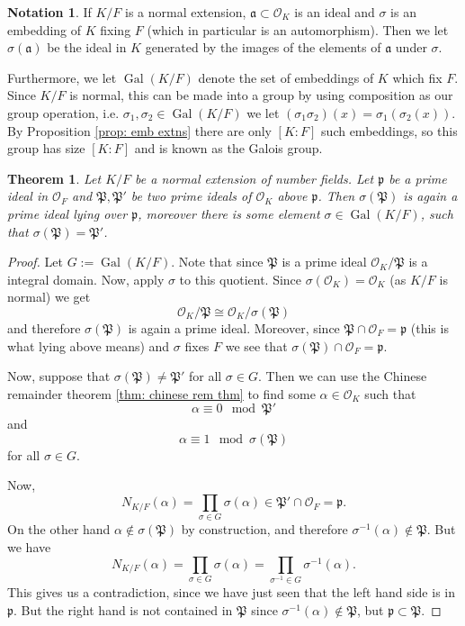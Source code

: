 \documentclass[11pt,a4paper]{report}
\theoremstyle{plain}
\newtheorem{thm}[subsection]{Theorem}
\theoremstyle{definition}
\theoremstyle{definition}
\newtheorem{nota}[subsection]{Notation}
\def \gothP{\mathfrak{P}}
\def\gothp{\mathfrak{p}}
\def \a{\alpha}
\def \s {\sigma}
\def \OO {\mathcal{O}}
\def \s {\sigma}
\def\gotha{\mathfrak{a}}
\DeclareMathOperator{\Gal}{Gal}
\begin{document}
	\begin{nota}
		If $K/F$ is a normal extension, $\gotha \subset \OO_K$ is an ideal and $\s$ is an embedding of $K$ fixing $F$ (which in particular is an automorphism). Then we let $\s(\gotha)$ be the ideal in $K$ generated by the images of the elements of $\gotha$ under $\s$. 
		
		Furthermore, we let $\Gal(K/F)$ denote the set of embeddings of $K$ which fix $F$. Since $K/F$ is normal, this can be made into a group by using composition as our group operation, i.e. $\s_1,\s_2 \in \Gal(K/F)$ we let $(\s_1 \s_2)(x)= \s_1(\s_2(x))$. By  Proposition \ref{prop: emb extns} there are only $[K:F]$ such embeddings, so this group has size $[K:F]$ and is known as the Galois group.
	\end{nota}
	
	
	
	
	
	\begin{thm}\label{thm: ideals and embs}
		Let $K/F$ be a normal extension of number fields. Let $\gothp$ be a prime ideal in $\OO_F$ and $\gothP,\gothP'$ be two prime ideals of $\OO_K$ above $\gothp$. Then $\s(\gothP)$ is again a prime ideal lying over $\gothp$, moreover there is some element $\s \in \Gal(K/F)$, such that $\s(\gothP)=\gothP'$.
	\end{thm}
	
	\begin{proof}
		Let $G:=\Gal(K/F)$. Note that since $\gothP$ is a prime ideal $\OO_K/\gothP$ is a integral domain. Now, apply $\s$ to this quotient. Since $\s(\OO_K)=\OO_K$ (as $K/F$ is normal) we get \[\OO_K/\gothP \cong \OO_K /\s(\gothP)\] and therefore $\s(\gothP)$ is again a prime ideal. Moreover, since $\gothP \cap \OO_F=\gothp$ (this is what lying above means) and $\s$ fixes $F$ we see that $\s(\gothP) \cap \OO_F=\gothp$. 
		
		
		Now, suppose that $\s(\gothP) \neq \gothP'$ for all $\s \in G$. Then we can use the Chinese remainder theorem \ref{thm: chinese rem thm} to find some $\a \in \OO_K$ such that \[\a \equiv 0 \mod \gothP'\] and \[\a \equiv 1 \mod \s(\gothP)\] for all $\s \in G$.
		
		Now, \[N_{K/F}(\a)=\prod_{\s \in G} \s(\a) \in \gothP' \cap \OO_F=\gothp.\] On the other hand $\a \not \in \s(\gothP)$ by construction, and therefore $\s^{-1}(\a) \not \in \gothP$. But we have \[N_{K/F}(\a)=\prod_{\s \in G} \s(\a)=\prod_{\s^{-1} \in G} \s^{-1}(\a).\] This gives us a contradiction, since we have just seen that the left hand side is in $\gothp$. But the right hand  is not contained in $\gothP$ since  $\s^{-1}(\a) \not \in \gothP$, but $\gothp \subset \gothP$. 
		
		
	\end{proof}
	
\end{document}
